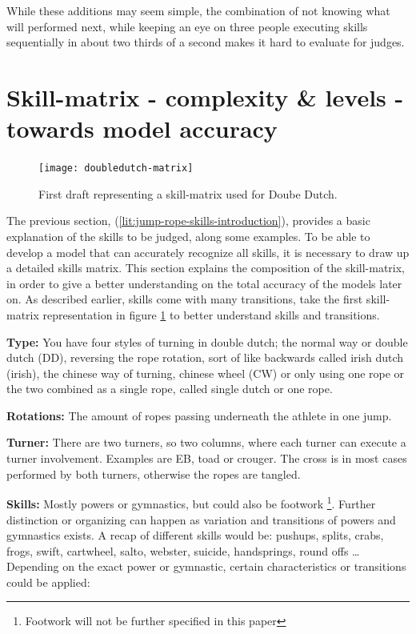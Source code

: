 While these additions may seem simple, the combination of not knowing what will performed next, while keeping an eye on three people executing skills sequentially in about two thirds of a second makes it hard to evaluate for judges.

\section{Skill-matrix - complexity \& levels - towards model accuracy}
\label{lit:skill-matrix}

\begin{figure}
    \centering
    \texttt{[image: doubledutch-matrix]}
    \caption[skill-matrix-DD]{First draft representing a skill-matrix used for Doube Dutch.}
    \label{fig:doubledutch-skill-matrix}
\end{figure}

The previous section, (\ref{lit:jump-rope-skills-introduction}), provides a basic explanation of the skills to be judged, along some examples. To be able to develop a model that can accurately recognize all skills, it is necessary to draw up a detailed skills matrix. This section explains the composition of the skill-matrix, in order to give a better understanding on the total accuracy of the models later on. As described earlier, skills come with many transitions, take the first skill-matrix representation in figure \ref{fig:doubledutch-skill-matrix} to better understand skills and transitions.

\textbf{Type:} You have four styles of turning in double dutch; the normal way or double dutch (DD), reversing the rope rotation, sort of like backwards called irish dutch (irish), the chinese way of turning, chinese wheel (CW) or only using one rope or the two combined as a single rope, called single dutch or one rope.

\textbf{Rotations:} The amount of ropes passing underneath the athlete in one jump.

\textbf{Turner:} There are two turners, so two columns, where each turner can execute a turner involvement. Examples are EB, toad or crouger. The cross is in most cases performed by both turners, otherwise the ropes are tangled.

\textbf{Skills:} Mostly powers or gymnastics, but could also be footwork \footnote{Footwork will not be further specified in this paper}. Further distinction or organizing can happen as variation and transitions of powers and gymnastics exists. A recap of different skills would be: pushups, splits, crabs, frogs, swift, cartwheel, salto, webster, suicide, handsprings, round offs \dots %
Depending on the exact power or gymnastic, certain characteristics or transitions could be applied:

